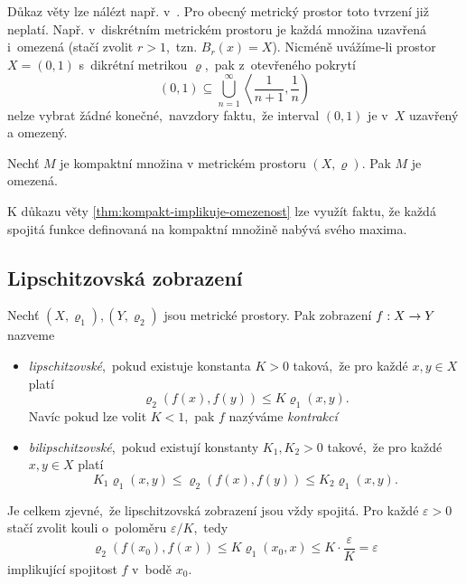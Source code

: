 Důkaz věty lze nálézt např. v~\citep[str. 166]{NetukaAnalyza2014}. Pro obecný metrický prostor toto tvrzení již neplatí. Např. v~diskrétním metrickém prostoru je každá množina uzavřená i~omezená (stačí zvolit $r>1$,~tzn. $B_r(x)=X$). Nicméně uvážíme-li prostor $X=(0,1)$ s~dikrétní metrikou $\varrho$,~pak z~otevřeného pokrytí
\[(0,1)\subseteq\bigcup_{n=1}^\infty\left\langle\dfrac{1}{n+1},\dfrac{1}{n}\right)\]
nelze vybrat žádné konečné,~navzdory faktu,~že interval $(0,1)$ je v~$X$ uzavřený a omezený.
\begin{theorem}\label{thm:kompakt-implikuje-omezenost}
    Nechť $M$ je kompaktní množina v metrickém prostoru $(X,\varrho)$. Pak $M$ je omezená.
\end{theorem}
K důkazu věty \ref{thm:kompakt-implikuje-omezenost} lze využít faktu, že každá spojitá funkce definovaná na kompaktní množině nabývá svého maxima.

\subsection{Lipschitzovská zobrazení}\label{subsec:lipschitzovska-zobrazeni}

\begin{definition}\label{def:bilipschitzovske-zobrazeni}
    Nechť $(X,\varrho_1),(Y,\varrho_2)$ jsou metrické prostory. Pak zobrazení $f:X \rightarrow Y$ nazveme 
    \begin{itemize}
        \item \emph{lipschitzovské},~pokud existuje konstanta $K>0$ taková,~že pro každé $x,y\in X$ platí
        \[\varrho_2(f(x),f(y))\leqslant K\varrho_1(x,y).\]
        Navíc pokud lze volit $K<1$,~pak $f$ nazýváme \emph{kontrakcí}
        \item \emph{bilipschitzovské},~pokud existují konstanty $K_1,K_2>0$ takové,~že pro každé $x,y\in X$ platí
        \[K_1\varrho_1(x,y)\leqslant\varrho_2(f(x),f(y))\leqslant K_2\varrho_1(x,y).\]
    \end{itemize}
\end{definition}
Je celkem zjevné,~že lipschitzovská zobrazení jsou vždy spojitá. Pro každé $\varepsilon>0$ stačí zvolit kouli o~poloměru $\varepsilon/K$,~tedy
\[\varrho_2(f(x_0),f(x))\leqslant K\varrho_1(x_0,x)\leqslant K\cdot\dfrac{\varepsilon}{K}=\varepsilon\]
implikující spojitost $f$ v~bodě $x_0$.